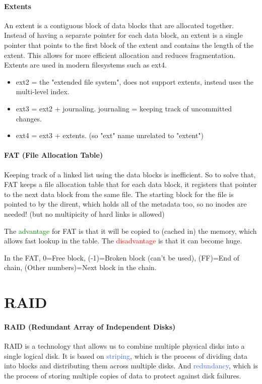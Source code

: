 \documentclass[openany,12pt]{book}
\newcommand{\red}[1]{\textcolor{Red}{#1}}
\newcommand{\blue}[1]{\textcolor{RoyalBlue}{#1}}
\newcommand{\green}[1]{\textcolor{Green}{#1}}
\begin{document}
\paragraph{Extents} An extent is a contiguous block of data blocks that are allocated together. Instead of having a separate pointer for each data block, an extent is a single pointer that points to the first block of the extent and contains the length of the extent. This allows for more efficient allocation and reduces fragmentation. Extents are used in modern filesystems such as ext4. 

\begin{itemize}
  \item ext2 = the "extended file system", does not support extents, instead uses the multi-level index.
  \item ext3 = ext2 + journaling. journaling = keeping track of uncommitted changes.
  \item ext4 = ext3 + extents. (so "ext" name unrelated to "extent")
\end{itemize}


\paragraph{FAT (File Allocation Table)} Keeping track of a linked list using the data blocks is inefficient. So to solve that, FAT keeps a file allocation table that for each data block, it registers that pointer to the next data block from the same file. The starting block for the file is pointed to by the dirent, which holds all of the metadata too, so no inodes are needed! (but no multipicity of hard links is allowed)

The \green{advantage} for FAT is that it will be copied to (cached in) the memory, which allows fast lookup in the table. The \red{disadvantage} is that it can become huge.

In the FAT, 0=Free block, (-1)=Broken block (can't be used), (FF)=End of chain, (Other numbers)=Next block in the chain.



\section*{RAID}

\paragraph{RAID (Redundant Array of Independent Disks)} RAID is a technology that allows us to combine multiple physical disks into a single logical disk. It is based on \blue{striping}, which is the process of dividing data into blocks and distributing them across multiple disks. And \blue{redundancy}, which is the process of storing multiple copies of data to protect against disk failures. 
\end{document}
